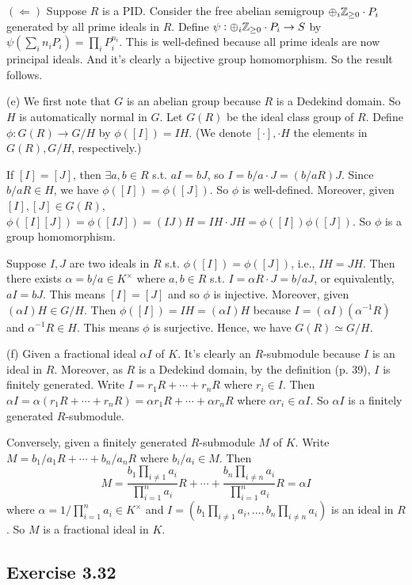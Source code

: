 \documentclass[../Marcus.tex]{subfiles}
\begin{document}
$(\Leftarrow)$ Suppose $R$ is a PID. Consider the free abelian semigroup $\oplus_{i} \mathbb{Z}_{\geq0}\cdot P_i$ generated by all prime ideals in $R$. Define $\psi:\oplus_{i} \mathbb{Z}_{\geq0}\cdot P_i \to S$ by $\psi(\sum_i n_iP_i)=\prod_i P_i^{n_i}$. This is well-defined because all prime ideals are now principal ideals. And it's clearly a bijective group homomorphism. So the result follows.

(e) We first note that $G$ is an abelian group because $R$ is a Dedekind domain. So $H$ is automatically normal in $G$. Let $G(R)$ be the ideal class group of $R$. Define $\phi:G(R)\to G/H$ by $\phi([I])=IH$. (We denote $[\cdot],\cdot H$ the elements in $G(R),G/H$, respectively.)

If $[I]=[J]$, then $\exists a,b\in R$ s.t. $aI=bJ$, so $I=b/a\cdot J = (b/aR)J$. Since $b/aR\in H$, we have $\phi([I])=\phi([J])$. So $\phi$ is well-defined. Moreover, given $[I],[J]\in G(R)$, $\phi([I][J])=\phi([IJ])=(IJ)H=IH\cdot JH=\phi([I])\phi([J])$. So $\phi$ is a group homomorphism.

Suppose $I,J$ are two ideals in $R$ s.t. $\phi([I])=\phi([J])$, i.e., $IH=JH$. Then there exists $\alpha=b/a\in K^\times$ where $a,b\in R$ s.t. $I=\alpha R\cdot J = b/a J$, or equivalently, $aI=bJ$. This means $[I]=[J]$ and so $\phi$ is injective. Moreover, given $(\alpha I)H\in G/H$. Then $\phi([I])=IH=(\alpha I)H$ because $I=(\alpha I)(\alpha^{-1}R)$ and $\alpha^{-1}R\in H$. This means $\phi$ is surjective. Hence, we have $G(R)\simeq G/H$.

(f) Given a fractional ideal $\alpha I$ of $K$. It's clearly an $R$-submodule because $I$ is an ideal in $R$. Moreover, as $R$ is a Dedekind domain, by the definition (p. 39), $I$ is finitely generated. Write $I=r_1R+\cdots+r_nR$ where $r_i\in I$. Then $\alpha I=\alpha(r_1R+\cdots+r_nR)=\alpha r_1R+\cdots+\alpha r_nR$ where $\alpha r_i\in\alpha I$. So $\alpha I$ is a finitely generated $R$-submodule. 

Conversely, given a finitely generated $R$-submodule $M$ of $K$. Write $M=b_1/a_1R+\cdots+b_n/a_nR$ where $b_i/a_i\in M$. Then $$M=\frac{b_1 \prod_{i\neq1} a_i}{\prod_{i=1}^n a_i}R+\cdots+\frac{b_n \prod_{i\neq n} a_i}{\prod_{i=1}^n a_i}R=\alpha I$$ where $\alpha=1/\prod_{i=1}^n a_i\in K^\times$ and $I=(b_1 \prod_{i\neq1} a_i,\ldots,b_n \prod_{i\neq n} a_i)$ is an ideal in $R$. So $M$ is a fractional ideal in $K$.

\subsection*{Exercise 3.32}
\end{document}
